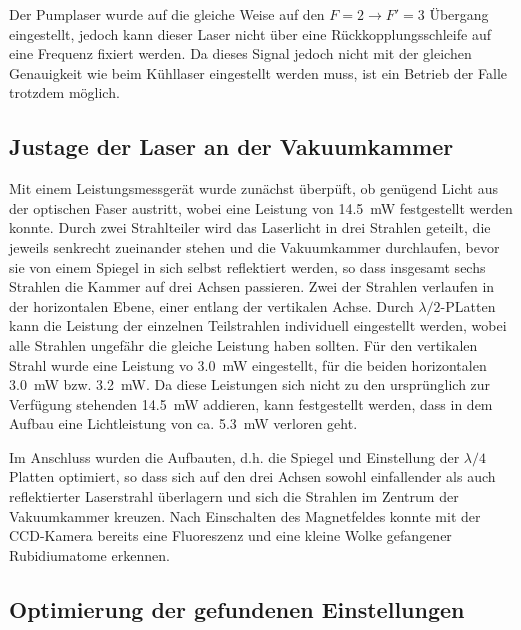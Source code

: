 \documentclass[11pt, a4paper]{article}
\numberwithin{equation}{section}
\begin{document}
Der Pumplaser wurde auf die gleiche Weise auf den $F=2 \rightarrow F\prime=3$ Übergang eingestellt, jedoch kann dieser Laser nicht über eine Rückkopplungsschleife auf eine Frequenz fixiert werden.
Da dieses Signal jedoch nicht mit der gleichen Genauigkeit wie beim Kühllaser eingestellt werden muss, ist ein Betrieb der Falle trotzdem möglich.

\subsection{Justage der Laser an der Vakuumkammer}

Mit einem Leistungsmessgerät wurde zunächst überpüft, ob genügend Licht aus der optischen Faser austritt, wobei eine Leistung von \SI{14,5}{mW} festgestellt werden konnte.
Durch zwei Strahlteiler wird das Laserlicht in drei Strahlen geteilt, die jeweils senkrecht zueinander stehen und die Vakuumkammer durchlaufen, bevor sie von einem Spiegel in sich selbst reflektiert werden, so dass insgesamt sechs Strahlen die Kammer auf drei Achsen passieren.
Zwei der Strahlen verlaufen in der horizontalen Ebene, einer entlang der vertikalen Achse.
Durch $\lambda/2$-PLatten kann die Leistung der einzelnen Teilstrahlen individuell eingestellt werden, wobei alle Strahlen ungefähr die gleiche Leistung haben sollten.
Für den vertikalen Strahl wurde eine Leistung vo \SI{3,0}{mW} eingestellt, für die beiden horizontalen \SI{3,0}{mW} bzw. \SI{3,2}{mW}.
Da diese Leistungen sich nicht zu den ursprünglich zur Verfügung stehenden \SI{14,5}{mW} addieren, kann festgestellt werden, dass in dem Aufbau eine Lichtleistung von ca. \SI{5,3}{mW} verloren geht.

Im Anschluss wurden die Aufbauten, d.h. die Spiegel und Einstellung der $\lambda/4$ Platten optimiert, so dass sich auf den drei Achsen sowohl einfallender als auch reflektierter Laserstrahl überlagern und sich die Strahlen im Zentrum der Vakuumkammer kreuzen.
Nach Einschalten des Magnetfeldes konnte mit der CCD-Kamera bereits eine Fluoreszenz und eine kleine Wolke gefangener Rubidiumatome erkennen.

\subsection{Optimierung der gefundenen Einstellungen}
\end{document}

